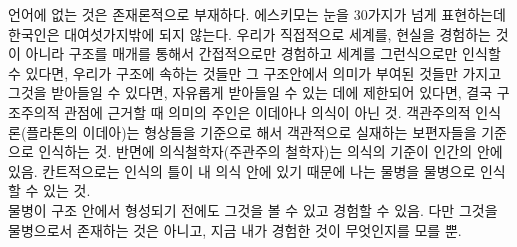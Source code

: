 \documentclass{article}
\begin{document}
언어에 없는 것은 존재론적으로 부재하다. 에스키모는 눈을 30가지가 넘게 표현하는데 한국인은 대여섯가지밖에 되지 않는다. 우리가 직접적으로 세계를, 현실을 경험하는 것이 아니라 구조를 매개를 통해서 간접적으로만 경험하고 세계를 그런식으로만 인식할 수 있다면, 우리가 구조에 속하는 것들만 그 구조안에서 의미가 부여된 것들만 가지고 그것을 받아들일 수 있다면, 자유롭게 받아들일 수 있는 데에 제한되어 있다면, 결국 구조주의적 관점에 근거할 때 의미의 주인은 이데아나 의식이 아닌 것. 객관주의적 인식론(플라톤의 이데아)는 형상들을 기준으로 해서 객관적으로 실재하는 보편자들을 기준으로 인식하는 것. 반면에 의식철학자(주관주의 철학자)는 의식의 기준이 인간의 안에 있음. 칸트적으로는 인식의 틀이 내 의식 안에 있기 때문에 나는 물병을 물병으로 인식할 수 있는 것. \\

물병이 구조 안에서 형성되기 전에도 그것을 볼 수 있고 경험할 수 있음. 다만 그것을 물병으로서 존재하는 것은 아니고, 지금 내가 경험한 것이 무엇인지를 모를 뿐. 
\end{document}
